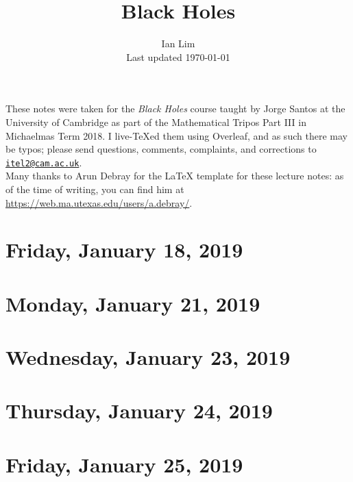 \documentclass[reqno]{amsart}
\begin{document}
\title{Black Holes}
\author{Ian Lim\\ Last updated \today}
\maketitle
{\small\noindent These notes were taken for the \textit{Black Holes} course taught by Jorge Santos at the University of Cambridge as part of the Mathematical Tripos Part III in Michaelmas Term 2018. I live-\TeX ed them using Overleaf, and as such there may be typos; please send questions, comments, complaints, and corrections to 
\href{mailto:itel2@cam.ac.uk?subject=BH\%20Lecture\%20Notes}{\texttt{itel2@cam.ac.uk}}.\\
Many thanks to Arun Debray for the {\LaTeX} template for these lecture notes: as of the time of writing, you can find him at \url{https://web.ma.utexas.edu/users/a.debray/}.}

\tableofcontents

\section{Friday, January 18, 2019}
	

\section{Monday, January 21, 2019}
    

\section{Wednesday, January 23, 2019}
    

\section{Thursday, January 24, 2019}
    

\section{Friday, January 25, 2019}
    
\end{document}
